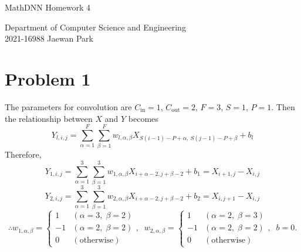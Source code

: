 \documentclass[10pt]{article}
\begin{document}
\begin{center}
    {\LARGE MathDNN Homework 4} \\
\end{center}
\begin{flushright}
    Department of Computer Science and Engineering \\
    2021-16988 Jaewan Park
\end{flushright}

\section*{Problem 1}
The parameters for convolution are $C_{\mathrm{in}} = 1$, $C_{\mathrm{out}} = 2$, $F = 3$, $S = 1$, $P = 1$.
Then the relationship between $X$ and $Y$ becomes
$$Y_{l, i, j} = \sum_{\alpha = 1}^{F}\sum_{\beta = 1}^{F}w_{l, \alpha, \beta}X_{S(i - 1) - P + \alpha, \: S(j - 1) - P + \beta} + b_{l}$$
Therefore,
$$Y_{1, i, j} = \sum_{\alpha = 1}^{3}\sum_{\beta = 1}^{3}w_{1, \alpha, \beta}X_{i + \alpha - 2, j + \beta - 2} + b_{1} = X_{i+1, j} - X_{i, j}$$
$$Y_{2, i, j} = \sum_{\alpha = 1}^{3}\sum_{\beta = 1}^{3}w_{2, \alpha, \beta}X_{i + \alpha - 2, j + \beta - 2} + b_{2} = X_{i, j+1} - X_{i, j}$$
$$\therefore w_{1, \alpha, \beta} = \begin{cases}
    1  & (\alpha = 3, \; \beta = 2) \\
    -1 & (\alpha = 2, \; \beta = 2) \\
    0  & (\textrm{otherwise})
\end{cases}, \;\; w_{2, \alpha, \beta} = \begin{cases}
    1  & (\alpha = 2, \; \beta = 3) \\
    -1 & (\alpha = 2, \; \beta = 2) \\
    0  & (\textrm{otherwise})
\end{cases}, \;\; b = 0.$$
\end{document}
